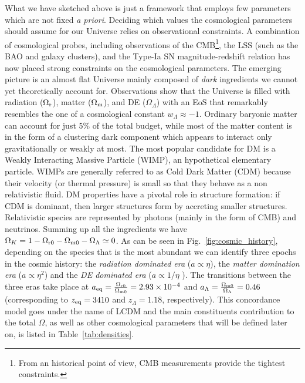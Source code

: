 What we have sketched above is just a framework that employs few parameters which are not fixed 
\emph{a priori}. Deciding which values the cosmological parameters should assume for our Universe 
relies on observational constraints. A combination of cosmological probes, including observations of the
\gls{CMB}\footnote{From an historical point of view, \gls{CMB} measurements provide the tightest constraints.}, the 
\gls{LSS} (such as the \gls{BAO} and galaxy clusters), and the Type-Ia SN magnitude-redshift relation has 
now placed strong constraints on the cosmological parameters. The emerging picture is an almost flat 
Universe mainly composed of \emph{dark} ingredients we cannot yet theoretically account for.
Observations show that the Universe is filled with radiation ($\Omega_{\rm r}$), matter 
($\Omega_{\rm m}$), and \gls{DE} ($\Omega_{\Lambda}$) with an EoS that remarkably resembles the one 
of a cosmological constant $w_{\Lambda}\approx - 1$. Ordinary baryonic matter can account for just 5\%
of the total budget, while most of the matter content is in the form of a clustering dark component which
appears to interact only gravitationally or weakly at most. The most popular candidate for \gls{DM} is a
Weakly Interacting Massive Particle (WIMP), an hypothetical elementary particle. WIMPs are generally
referred to as Cold Dark Matter (CDM) because their velocity (or thermal pressure) is small so that they behave as a  non relativistic fluid. \gls{DM} properties have a pivotal role in structure formation: if CDM is dominant, then larger structures form by accreting smaller structures. Relativistic  species are represented by photons (mainly in the form of \gls{CMB}) and neutrinos. Summing up all the ingredients we have 
$\Omega_K = 1- \Omega_{\rm{r0}} - \Omega_{\rm{m0}} - \Omega_{\Lambda} \simeq 0$.
As can be seen in Fig.~\eqref{fig:cosmic_history}, depending on the species that is the most abundant we can identify three epochs in the cosmic history: the \emph{radiation dominated era} ($a \propto \eta$), the \emph{matter domination era} ($a \propto \eta^2$)
and the \emph{\gls{DE} dominated era} ($a \propto 1/\eta$ ). The transitions between the three eras take 
place at $a_{\rm{eq}} = \frac{\Omega_{\rm r0}}{\Omega_{\rm m0}} = 2.93\times10^{-4}$ and 
$a_{\Lambda} = \frac{\Omega_{\rm m0}}{\Omega_{\Lambda}} = 0.46$ (corresponding to $z_{\rm{eq}}=
3410$ and $z_{\Lambda} = 1.18$, respectively). This concordance model goes under the name of \gls{LCDM} and the main constituents contribution to the total $\Omega$, as well as other cosmological parameters that will be defined later on, is listed in Table~\eqref{tab:densities}. 
